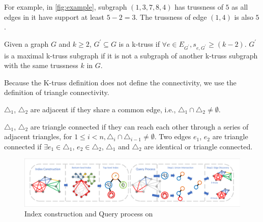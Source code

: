 For example, in \autoref{fig:example}, subgraph $(1,3,7,8,4)$ has trussness of $5$ as all edges in it have support at least $5-2=3$. The trussness of edge $(1,4)$ is also $5$.

\begin{Def}[k-truss]
Given a graph $G$ and $k \ge 2$, $G^{\prime} \subseteq G$ is a k-truss if $\forall e \in E_{G^{\prime}}, s_{e,G^{\prime}} \ge (k - 2)$. 
$G^{\prime}$ is a maximal k-truss subgraph if it is not a subgraph of another k-truss subgraph with the same trussness $k$ in $G$.
\label{def:k-truss}
\end{Def}


Because the K-truss definition does not define the connectivity, we use the definition of triangle connectivity.

\begin{Def}
${\triangle}_{1}$, ${\triangle}_{2}$ are adjacent if they share a common edge, i.e., ${\triangle}_{1} \cap {\triangle}_{2} \neq \emptyset$. 
\label{def:triangle_adjacency}
\end{Def}

\begin{Def} 
${\triangle}_{1}$, ${\triangle}_{2}$ are triangle connected if they can reach each other through a series of adjacent triangles, \ie for $1 \le i < n, {\triangle}_{i} \cap {\triangle}_{i-1} \neq \emptyset$. Two edges $e_1$, $e_2$ are triangle connected if $\exists e_{1} \in {\triangle}_{1}$, $e_{2} \in {\triangle}_{2}$, ${\triangle}_{1}$ and ${\triangle}_{2}$ are identical or triangle connected.
\label{def:triangle_connectivity}
\end{Def}

\begin{figure}[ht]
    \centering
    \includegraphics[width=0.9\linewidth, trim={0.6cm 0.6cm, 0.6cm, 0.6cm}, clip]{./figures/flow.pdf}
		\vspace{-0.2cm}
    \caption{Index construction and Query process on \twolevelindex{}}
    \label{fig:flow}
		\vspace{-0.5cm}
\end{figure}

